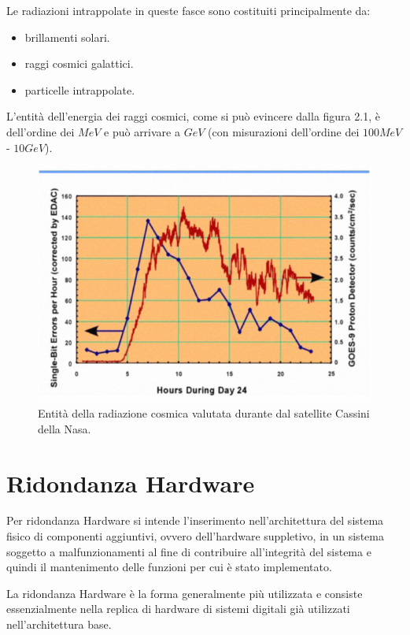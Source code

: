 \documentclass[LaM,binding=0.6cm]{../sapthesis}
\begin{document}
Le radiazioni intrappolate in queste fasce sono costituiti principalmente da:
\begin{itemize}
    \item brillamenti solari.
    
    \item raggi cosmici galattici.
    
    \item particelle intrappolate.
\end{itemize}

L'entità dell'energia dei raggi cosmici, come si può evincere dalla figura 2.1, è dell'ordine dei $MeV$ e può arrivare a $GeV$ (con misurazioni dell'ordine  dei $100 MeV$ - $10GeV$).
    \begin{figure}[htbp]
    \centerline{\includegraphics[scale=.67]{examples/CassiniFlares.PNG}}
    \caption{Entità della radiazione cosmica valutata durante dal satellite Cassini della Nasa.}
    \label{fig}
    \end{figure}
\clearpage
\section{ Ridondanza Hardware }

Per ridondanza Hardware si intende l'inserimento nell'architettura del sistema fisico di componenti aggiuntivi, ovvero dell'hardware suppletivo, in un sistema soggetto a malfunzionamenti al fine di contribuire all'integrità del sistema e quindi il mantenimento delle funzioni per cui è stato implementato.

La ridondanza Hardware è la forma generalmente più utilizzata e consiste essenzialmente nella replica di hardware di sistemi digitali già utilizzati nell'architettura base.
\end{document}
